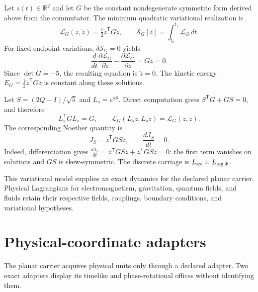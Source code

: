 \documentclass[10pt]{article}
\begin{document}
Let $z(t)\in\mathbb R^2$ and let $G$ be the constant nondegenerate symmetric form derived above from the commutator. The minimum quadratic variational realization is
\begin{equation}
\boxed{\mathscr L_G(z,\dot z)=\tfrac12\dot z^{\mathsf T}G\dot z,\qquad
\mathscr S_G[z]=\int_{t_0}^{t_1}\mathscr L_G\,dt.}
\end{equation}
For fixed-endpoint variations, $\delta\mathscr S_G=0$ yields
\begin{equation}
\frac{d}{dt}\frac{\partial\mathscr L_G}{\partial\dot z}
-\frac{\partial\mathscr L_G}{\partial z}=G\ddot z=0.
\end{equation}
Since $\det G=-5$, the resulting equation is $\ddot z=0$. The kinetic energy
$E_G=\tfrac12\dot z^{\mathsf T}G\dot z$ is constant along these solutions.

Let $S=(2Q-I)/\sqrt5$ and $L_s=e^{sS}$. Direct computation gives
$S^{\mathsf T}G+GS=0$, and therefore
\begin{equation}
\boxed{L_s^{\mathsf T}GL_s=G,\qquad
\mathscr L_G(L_sz,L_s\dot z)=\mathscr L_G(z,\dot z).}
\end{equation}
The corresponding Noether quantity is
\begin{equation}
\boxed{J_S=\dot z^{\mathsf T}GSz,\qquad \frac{dJ_S}{dt}=0.}
\end{equation}
Indeed, differentiation gives
$\frac{dJ_S}{dt}=\ddot z^{\mathsf T}GSz+\dot z^{\mathsf T}GS\dot z=0$:
the first term vanishes on solutions and $GS$ is skew-symmetric.
The discrete carriage is $L_{\rm ax}=L_{\log\Phi}$.

This variational model supplies an exact dynamics for the declared planar carrier.
Physical Lagrangians for electromagnetism, gravitation, quantum fields, and
fluids retain their respective fields, couplings, boundary conditions, and
variational hypotheses.

\section{Physical-coordinate adapters}\label{sec:adapters}
The planar carrier acquires physical units only through a declared adapter. Two exact adapters display its timelike and phase-rotational offices without identifying them.
\end{document}
